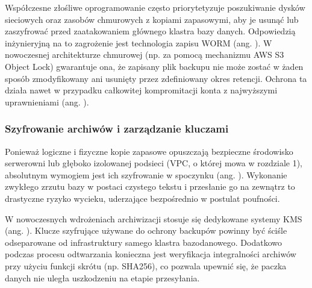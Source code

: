 \documentclass[a4paper,11pt,english,openany,oneside]{sphinxmanual}
\begin{document}
\sphinxAtStartPar
Współczesne złośliwe oprogramowanie często priorytetyzuje poszukiwanie dysków sieciowych oraz zasobów chmurowych z kopiami zapasowymi, aby je usunąć lub zaszyfrować przed zaatakowaniem głównego klastra bazy danych. Odpowiedzią inżynieryjną na to zagrożenie jest technologia zapisu WORM (ang. ). W nowoczesnej architekturze chmurowej (np. za pomocą mechanizmu AWS S3 Object Lock) gwarantuje ona, że zapisany plik backupu nie może zostać w żaden sposób zmodyfikowany ani usunięty przez zdefiniowany okres retencji. Ochrona ta działa nawet w przypadku całkowitej kompromitacji konta z najwyższymi uprawnieniami (ang. ).


\subsubsection{Szyfrowanie archiwów i zarządzanie kluczami}
\label{\detokenize{rozdzial_2/rozdzial_27/rozdzial_6:szyfrowanie-archiwow-i-zarzadzanie-kluczami}}
\sphinxAtStartPar
Ponieważ logiczne i fizyczne kopie zapasowe opuszczają bezpieczne środowisko serwerowni lub głęboko izolowanej podsieci (VPC, o której mowa w rozdziale 1), absolutnym wymogiem jest ich szyfrowanie w spoczynku (ang. ). Wykonanie zwykłego zrzutu bazy w postaci czystego tekstu i przesłanie go na zewnątrz to drastyczne ryzyko wycieku, uderzające bezpośrednio w postulat poufności.

\sphinxAtStartPar
W nowoczesnych wdrożeniach archiwizacji stosuje się dedykowane systemy KMS (ang. ). Klucze szyfrujące używane do ochrony backupów powinny być ściśle odseparowane od infrastruktury samego klastra bazodanowego. Dodatkowo podczas procesu odtwarzania konieczna jest weryfikacja integralności archiwów przy użyciu funkcji skrótu (np. SHA\sphinxhyphen{}256), co pozwala upewnić się, że paczka danych nie uległa uszkodzeniu na etapie przesyłania.
\end{document}
